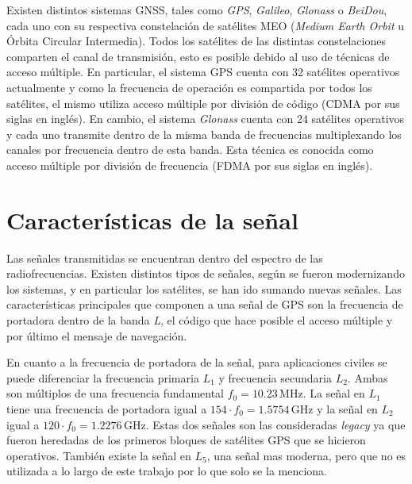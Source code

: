 \documentclass[a4paper,12pt,oneside,onecolumn,final,openright]{book}%
\begin{document}
	Existen distintos sistemas GNSS, tales como \textit{GPS}, \textit{Galileo}, \textit{Glonass} o \textit{BeiDou}, cada uno con su respectiva constelación de satélites MEO (\textit{Medium Earth Orbit} u Órbita Circular Intermedia). Todos los satélites de las distintas constelaciones comparten el canal de transmisión, esto es posible debido al uso de técnicas de acceso múltiple. En particular, el sistema GPS cuenta con 32 satélites operativos actualmente y como la frecuencia de operación es compartida por todos los satélites, el mismo utiliza acceso múltiple por división de código (CDMA por sus siglas en inglés). En cambio, el sistema \textit{Glonass} cuenta con 24 satélites operativos y cada uno transmite dentro de la misma banda de frecuencias multiplexando los canales por frecuencia dentro de esta banda. Esta técnica es conocida como acceso múltiple por división de frecuencia (FDMA por sus siglas en inglés).
	
\section{Características de la señal}\label{sec:senial}
	Las señales transmitidas se encuentran dentro del espectro de las radiofrecuencias. Existen distintos tipos de señales, según se fueron modernizando los sistemas, y en particular los satélites, se han ido sumando nuevas señales. Las características principales que componen a una señal de GPS son la frecuencia de portadora dentro de la banda \textit{L}, el código que hace posible el acceso múltiple y por último el mensaje de navegación.
	
	En cuanto a la frecuencia de portadora de la señal, para aplicaciones civiles se puede diferenciar la frecuencia primaria $L_1$ y frecuencia secundaria $L_2$. Ambas son múltiplos de una frecuencia fundamental $f_0=10.23$\,MHz. La señal en $L_1$ tiene una frecuencia de portadora igual a $154\cdot f_0 = 1.5754$\,GHz y la señal en $L_2$ igual a $120\cdot f_0 = 1.2276$\,GHz. Estas dos señales son las consideradas \textit{legacy} ya que fueron heredadas de los primeros bloques de satélites GPS que se hicieron operativos. También existe la señal en $L_5$, una señal mas moderna, pero que no es utilizada a lo largo de este trabajo por lo que solo se la menciona.
	
\end{document}
